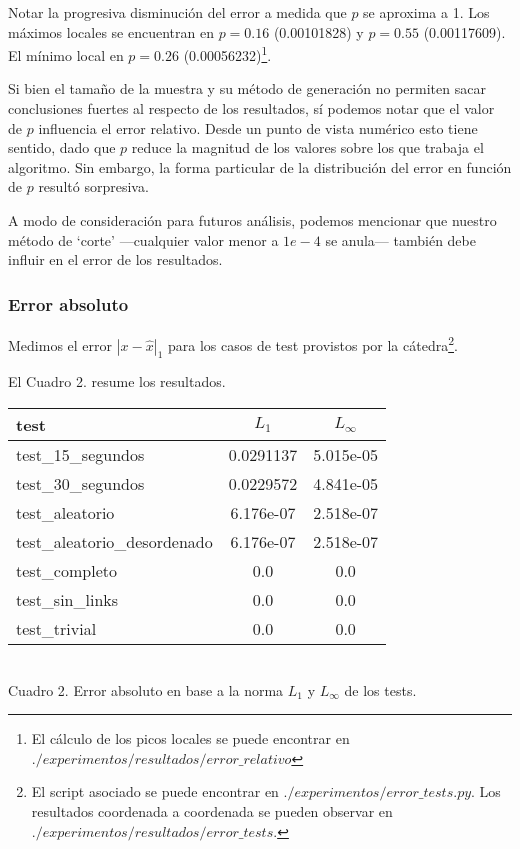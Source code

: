 Notar la progresiva disminución del error a medida que $p$ se aproxima a 1. Los máximos locales se encuentran en $p = 0.16$ (0.00101828)  y $p = 0.55$ (0.00117609). El mínimo local en $p = 0.26$ (0.00056232)\footnote{El cálculo de los picos locales se puede encontrar en $./experimentos/resultados/error\_relativo$}. 

\vspace{1em}
Si bien el tamaño de la muestra y su método de generación no permiten sacar conclusiones fuertes al respecto de los resultados, sí podemos notar que el valor de $p$ influencia el error relativo. Desde un punto de vista numérico esto tiene sentido, dado que $p$ reduce la  magnitud de los valores sobre los que trabaja el algoritmo. Sin embargo, la forma particular de la distribución del error en función de $p$ resultó sorpresiva. 

\vspace{1em}
A modo de consideración para futuros análisis, podemos mencionar que nuestro método de `corte' ---cualquier valor menor a $1e-4$ se anula--- también debe influir en el error de los resultados. 


\newpage
\subsubsection{Error absoluto} Medimos el error $|x - \hat{x}|_1$ para los casos de test provistos por la cátedra\footnote{El script asociado se puede encontrar en $./experimentos/error\_tests.py$. Los resultados coordenada a coordenada se pueden observar en $./experimentos/resultados/error\_tests$.}. 
\vspace{1em}

\noindent El Cuadro 2. resume los resultados.
\vspace{1.5em}

\begin{center}
    \begin{tabular}{ |l|c|c| } 
    \hline
    test                         & $L_1$        & $L_\infty$ \\
    \hline
    test\_15\_segundos           & 0.0291137    & 5.015e-05\\
    test\_30\_segundos           & 0.0229572    & 4.841e-05\\
    test\_aleatorio              & 6.176e-07    & 2.518e-07\\
    test\_aleatorio\_desordenado & 6.176e-07    & 2.518e-07\\
    test\_completo               & 0.0          & 0.0\\
    test\_sin\_links             & 0.0          & 0.0\\
    test\_trivial                & 0.0          & 0.0\\
    \hline
    \end{tabular} \\
    \bigskip
    Cuadro 2. Error absoluto en base a la norma $L_1$ y $L_\infty$ de los tests.
\end{center}
\vspace{1em}

